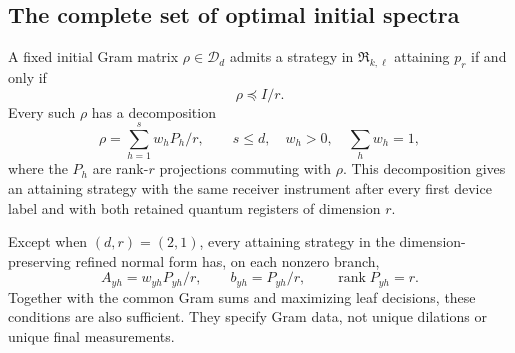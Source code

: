 \subsection{The complete set of optimal initial spectra}
\begin{theorem}\label{thm:initialspectra93}
A fixed initial Gram matrix $\rho\in\mathcal D_d$ admits a strategy
in $\mathfrak R_{k,\ell}$ attaining $p_r$ if and only if
\begin{equation}\label{eq:spectralcap93}
                  \rho\preceq I/r.
\end{equation}
Every such $\rho$ has a decomposition
\begin{equation}\label{eq:projectionframe93}
 \rho=\sum_{h=1}^{s}w_hP_h/r,\qquad s\le d,\quad
 w_h>0,\quad\sum_hw_h=1,
\end{equation}
where the $P_h$ are rank-$r$ projections commuting with $\rho$.
This decomposition gives an attaining strategy with the same receiver
instrument after every first device label and with both retained
quantum registers of dimension $r$.

Except when $(d,r)=(2,1)$, every attaining strategy in the
dimension-preserving refined normal form has, on each nonzero branch,
\begin{equation}\label{eq:optimalgrams93}
       A_{yh}=w_{yh}P_{yh}/r,\qquad b_{yh}=P_{yh}/r,
       \qquad \operatorname{rank}P_{yh}=r.
\end{equation}
Together with the common Gram sums and maximizing leaf decisions,
these conditions are also sufficient.  They specify Gram data, not
unique dilations or unique final measurements.
\end{theorem}

